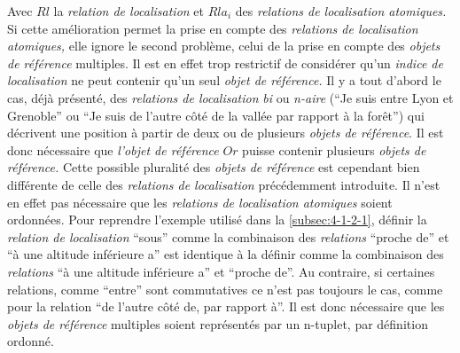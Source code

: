 Avec \(Rl\) la \emph{relation de localisation} et \(Rla_i\) des
\emph{relations de localisation atomiques.} Si cette amélioration
permet la prise en compte des \emph{relations de localisation
  atomiques,} elle ignore le second problème, celui de la prise en
compte des \emph{objets de référence} multiples. Il est en effet trop
restrictif de considérer qu'un \emph{indice de localisation} ne peut
contenir qu'un seul \emph{objet de référence.}  Il y a tout d'abord le
cas, déjà présenté, des \emph{relations de localisation} \emph{bi} ou
\emph{n-aire} (\eg \enquote{Je suis entre Lyon et Grenoble} ou
\enquote{Je suis de l'autre côté de la vallée par rapport à la forêt})
qui décrivent une position à partir de deux ou de plusieurs
\emph{objets de référence}. Il est donc nécessaire que \emph{l'objet
  de référence} \(Or\) puisse contenir plusieurs \emph{objets de
  référence.} Cette possible pluralité des \emph{objets de référence}
est cependant bien différente de celle des \emph{relations de
  localisation} précédemment introduite. Il n'est en effet pas
nécessaire que les \emph{relations de localisation atomiques} soient
ordonnées. Pour reprendre l'exemple utilisé dans la
\autoref{subsec:4-1-2-1}, définir la \emph{relation de localisation}
\enquote{sous} comme la combinaison des \emph{relations}
\enquote{proche de} et \enquote{à une altitude inférieure a} est
identique à la définir comme la combinaison des \emph{relations}
\enquote{à une altitude inférieure a} et \enquote{proche de}. Au
contraire, si certaines relations, comme \enquote{entre} sont
commutatives ce n'est pas toujours le cas, comme pour la relation
\enquote{de l'autre côté de, par rapport à}. Il est donc nécessaire
que les \emph{objets de référence} multiples soient représentés par un
n-tuplet, par définition ordonné.

